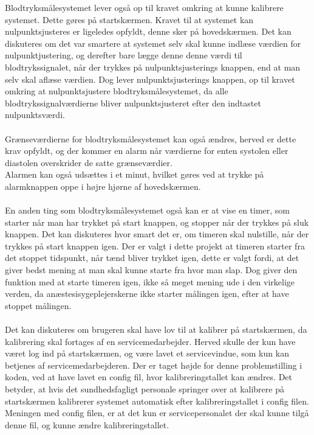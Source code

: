 Blodtryksmålesystemet lever også op til kravet omkring at kunne kalibrere systemet. Dette gøres på startskærmen. Kravet til at systemet kan nulpunktsjusteres er ligeledes opfyldt, denne sker på hovedskærmen. Det kan diskuteres om det var smartere at systemet selv skal kunne indlæse værdien for nulpunktjustering, og derefter bare lægge denne denne værdi til blodtrykssignalet, når der trykkes på nulpunktsjusterings knappen, end at man selv skal aflæse værdien. Dog lever nulpunktsjusterings knappen, op til kravet omkring at nulpunktsjustere blodtryksmålesystemet, da alle blodtrykssignalværdierne bliver nulpunktsjusteret efter den indtastet nulpunktsværdi. \\\\
Grænseværdierne for blodtryksmålesystemet kan også ændres, herved er dette krav opfyldt, og der kommer en alarm når værdierne for enten systolen eller diastolen overskrider de satte grænseværdier. \\
Alarmen kan også udsættes i et minut, hvilket gøres ved at trykke på alarmknappen oppe i højre hjørne af hovedskærmen. \\\\
En anden ting som blodtryksmålesystemet også kan er at vise en timer, som starter når man har trykket på start knappen, og stopper når der trykkes på sluk knappen. Det kan diskuteres hvor smart det er, om timeren skal nulstille, når der trykkes på start knappen igen. Der er valgt i dette projekt at timeren starter fra det stoppet tidspunkt, når tænd bliver trykket igen, dette er valgt fordi, at det giver bedst mening at man skal kunne starte fra hvor man slap. Dog giver den funktion med at starte timeren igen, ikke så meget mening ude i den virkelige verden, da anæstesisygeplejerskerne ikke starter målingen igen, efter at have stoppet målingen. \\\\
Det kan diskuteres om brugeren skal have lov til at kalibrer på startskærmen, da kalibrering skal fortages af en servicemedarbejder. Herved skulle der kun have været log ind på startskærmen, og være lavet et servicevindue, som kun kan betjenes af servicemedarbejderen. Der er taget højde for denne problemstilling i koden, ved at have lavet en config fil, hvor kalibreringstallet kan ændres. Det betyder, at hvis det sundhedsfagligt personale springer over at kalibrere på startskærmen kalibrerer systemet automatisk efter kalibreringstallet i config filen. Meningen med config filen, er at det kun er servicepersonalet der skal kunne tilgå denne fil, og kunne ændre kalibreringstallet.
